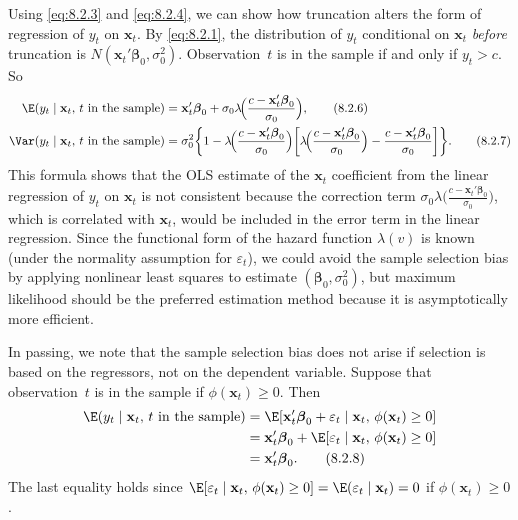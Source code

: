 Using \eqref{eq:8.2.3} and \eqref{eq:8.2.4}, we can show how truncation alters the form of
regression of $y_t$ on $\mathbf{x}_t$. By \eqref{eq:8.2.1}, the distribution of $y_t$ conditional on $\mathbf{x}_t$ \emph{before}
truncation is $N(\mathbf{x}_t'\boldsymbol{\beta}_0, \sigma_0^2)$. Observation~$t$ is in the sample if and only if $y_t > c$. So
\begin{align}
  \E(y_t \mid \mathbf{x}_t,\, t \text{ in the sample})
  &= \mathbf{x}_t'\boldsymbol{\beta}_0
     + \sigma_0 \lambda\!\Bigl(\frac{c - \mathbf{x}_t'\boldsymbol{\beta}_0}{\sigma_0}\Bigr),
  \label{eq:8.2.6} \tag{8.2.6} \\
  \Var(y_t \mid \mathbf{x}_t,\, t \text{ in the sample})
  &= \sigma_0^2 \biggl\{1 - \lambda\!\Bigl(\frac{c - \mathbf{x}_t'\boldsymbol{\beta}_0}{\sigma_0}\Bigr)
     \biggl[\lambda\!\Bigl(\frac{c - \mathbf{x}_t'\boldsymbol{\beta}_0}{\sigma_0}\Bigr)
     - \frac{c - \mathbf{x}_t'\boldsymbol{\beta}_0}{\sigma_0}\biggr]\biggr\}.
  \label{eq:8.2.7} \tag{8.2.7}
\end{align}
This formula shows that the OLS estimate of the $\mathbf{x}_t$ coefficient from the linear
regression of $y_t$ on $\mathbf{x}_t$ is not consistent because the correction term
$\sigma_0 \lambda\bigl(\frac{c - \mathbf{x}_t'\boldsymbol{\beta}_0}{\sigma_0}\bigr)$,
which is correlated with $\mathbf{x}_t$, would be included in the error term in the linear regression. Since the functional form of the hazard function $\lambda(v)$ is known (under the
normality assumption for $\varepsilon_t$), we could avoid the sample selection bias by applying nonlinear least squares to estimate $(\boldsymbol{\beta}_0, \sigma_0^2)$, but maximum likelihood should
be the preferred estimation method because it is asymptotically more efficient.

In passing, we note that the sample selection bias does not arise if selection is
based on the regressors, not on the dependent variable. Suppose that observation~$t$
is in the sample if $\phi(\mathbf{x}_t) \geq 0$. Then
\begin{align}
  \E(y_t \mid \mathbf{x}_t,\, t \text{ in the sample})
  &= \E[\mathbf{x}_t'\boldsymbol{\beta}_0 + \varepsilon_t
     \mid \mathbf{x}_t,\, \phi(\mathbf{x}_t) \geq 0] \notag \\
  &= \mathbf{x}_t'\boldsymbol{\beta}_0
     + \E[\varepsilon_t \mid \mathbf{x}_t,\, \phi(\mathbf{x}_t) \geq 0] \notag \\
  &= \mathbf{x}_t'\boldsymbol{\beta}_0.
  \label{eq:8.2.8} \tag{8.2.8}
\end{align}
The last equality holds since
$\E[\varepsilon_t \mid \mathbf{x}_t,\, \phi(\mathbf{x}_t) \geq 0]
= \E(\varepsilon_t \mid \mathbf{x}_t) = 0$ if $\phi(\mathbf{x}_t) \geq 0$.

